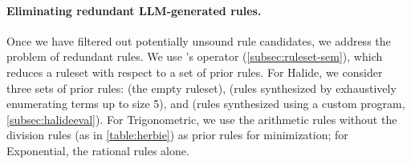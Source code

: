 \paragraph*{Eliminating redundant LLM-generated rules.}
Once we have filtered out potentially unsound rule candidates,
  we address the problem
  of redundant rules.
We use \enumo's  operator (\autoref{subsec:ruleset-sem}),
  which reduces a ruleset with respect to a set of prior rules.
For Halide, we consider three sets of prior rules:  (the empty ruleset),
   (rules synthesized by exhaustively enumerating terms up to size 5),
  and  (rules synthesized using a custom \enumo
  program, \autoref{subsec:halideeval}).
For Trigonometric, we use the arithmetic rules  without the
  division rules (as in \autoref{table:herbie}) as prior rules for
  minimization; for Exponential, the rational rules  alone.


